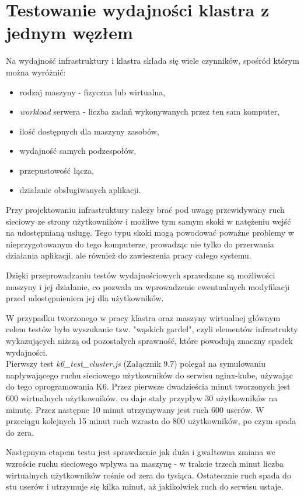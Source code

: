 \section {Testowanie wydajności klastra z jednym węzłem}

Na wydajność infrastruktury i klastra składa się wiele czynników, spośród którym można wyróżnić:

\begin{itemize}
    \item rodzaj maszyny - fizyczna lub wirtualna,
    \item \textit{workload} serwera - liczba zadań wykonywanych przez ten sam komputer,
    \item ilość dostępnych dla maszyny zasobów,
    \item wydajność samych podzespołów,
    \item przepustowość łącza,
    \item działanie obsługiwanych aplikacji.
\end{itemize}

Przy projektowaniu infrastruktury należy brać pod uwagę przewidywany ruch sieciowy ze strony użytkowników i możliwe tym samym skoki w natężeniu wejść na udostępnianą usługę. Tego typu skoki mogą powodować poważne problemy w nieprzygotowanym do tego komputerze, prowadząc nie tylko do przerwania działania aplikacji, ale również do zawieszenia pracy całego systemu. 

Dzięki przeprowadzaniu testów wydajnościowych sprawdzane są możliwości maszyny i jej działanie, co pozwala na wprowadzenie ewentualnych modyfikacji przed udostępnieniem jej dla użytkowników. 

W przypadku tworzonego w pracy klastra oraz maszyny wirtualnej głównym celem testów było wyszukanie tzw. "wąskich gardeł", czyli elementów infrastrukty wykazujących niższą od pozostałych sprawność, które powodują znaczny spadek wydajności.\\

Pierwszy test \textit{k6\_test\_cluster.js} (Załącznik 9.7) polegał na symulowaniu napływającego ruchu sieciowego użytkowników do serwisu nginx-kube, używając do tego oprogramowania K6.
Przez pierwsze dwadzieścia minut tworzonych jest 600 wirtualnych użytkowników, co daje stały przypływ 30 użytkowników na minutę. Przez następne 10 minut utrzymywany jest ruch 600 userów. W przeciągu kolejnych 15 minut ruch wzrasta do 800 użytkowników, po czym spada do zera. 

Następnym etapem testu jest sprawdzenie jak duża i gwałtowna zmiana we wzroście ruchu sieciowego wpływa na maszynę - w trakcie trzech minut liczba wirtualnych użytkowników rośnie od zera do tysiąca. Ostatecznie ruch spada do stu userów i utrzymuje się kilka minut, aż jakikolwiek ruch do serwisu ustaje.\\

